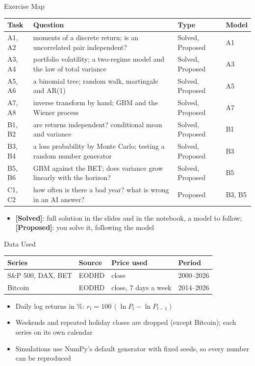 \begin{frame}{Exercise Map}
\itemsize{\small}
\begin{center}
\footnotesize
\begin{tabular}{>{\raggedright\arraybackslash}p{1.0cm}>{\raggedright\arraybackslash}p{7.6cm}>{\raggedright\arraybackslash}p{1.9cm}>{\raggedright\arraybackslash}p{1.4cm}}
\toprule
\textbf{Task} & \textbf{Question} & \textbf{Type} & \textbf{Model} \\
\midrule
A1, A2 & moments of a discrete return; is an uncorrelated pair independent? & Solved, Proposed & A1 \\
A3, A4 & portfolio volatility; a two-regime model and the law of total variance & Solved, Proposed & A3 \\
A5, A6 & a binomial tree; random walk, martingale and AR(1) & Solved, Proposed & A5 \\
A7, A8 & inverse transform by hand; GBM and the Wiener process & Solved, Proposed & A7 \\
B1, B2 & are returns independent? conditional mean and variance & Solved, Proposed & B1 \\
B3, B4 & a loss probability by Monte Carlo; testing a random number generator & Solved, Proposed & B3 \\
B5, B6 & GBM against the BET; does variance grow linearly with the horizon? & Solved, Proposed & B5 \\
C1, C2 & how often is there a bad year? what is wrong in an AI answer? & Proposed & B3, B5 \\
\bottomrule
\end{tabular}
\end{center}
\begin{itemize}
    \item \textbf{[Solved]}: full solution in the slides and in the notebook, a model to follow; \textbf{[Proposed]}: you solve it, following the model
\end{itemize}
\end{frame}

\begin{frame}{Data Used}
\itemsize{\small}
\begin{center}
\footnotesize
\begin{tabular}{llll}
\toprule
\textbf{Series} & \textbf{Source} & \textbf{Price used} & \textbf{Period} \\
\midrule
S\&P 500, DAX, BET & EODHD & close & 2000--2026 \\
Bitcoin & EODHD & close, 7 days a week & 2014--2026 \\
\bottomrule
\end{tabular}
\end{center}
\begin{itemize}
    \item Daily log returns in \%: $r_t = 100\,(\ln P_t - \ln P_{t-1})$
    \item Weekends and repeated holiday closes are dropped (except Bitcoin); each series on its own calendar
    \item Simulations use NumPy's default generator with fixed seeds, so every number can be reproduced
\end{itemize}
\end{frame}


